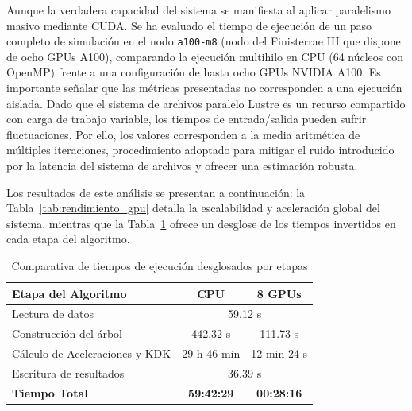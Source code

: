 Aunque la verdadera capacidad del sistema se manifiesta al aplicar paralelismo masivo mediante CUDA. Se ha evaluado el tiempo de ejecución de un paso completo de simulación en el nodo \texttt{a100-m8} (nodo del Finisterrae III que dispone de ocho GPUs A100), comparando la ejecución multihilo en CPU (64 núcleos con OpenMP) frente a una configuración de hasta ocho GPUs NVIDIA A100.
Es importante señalar que las métricas presentadas no corresponden a una ejecución aislada.
Dado que el sistema de archivos paralelo Lustre es un recurso compartido con carga de trabajo variable, los tiempos de entrada/salida pueden sufrir fluctuaciones.
Por ello, los valores corresponden a la media aritmética de múltiples iteraciones, procedimiento adoptado para mitigar el ruido introducido por la latencia del sistema de archivos y ofrecer una estimación robusta.

Los resultados de este análisis se presentan a continuación: la Tabla~\ref{tab:rendimiento_gpu} detalla la escalabilidad y aceleración global del sistema, mientras que la Tabla~\ref{tab:comparativa_cpu_gpu} ofrece un desglose de los tiempos invertidos en cada etapa del algoritmo.

\begin{table}[htbp]
    \centering
    \begin{tabularx}{\textwidth}{|X|c|c|}
        \hline
        \textbf{Etapa del Algoritmo} & \textbf{CPU} & \textbf{8 GPUs} \\ \hline

        Lectura de datos & \multicolumn{2}{c|}{59.12 s} \\ \hline

        Construcción del árbol  & 442.32 s & 111.73 s \\ \hline
        Cálculo de Aceleraciones y KDK  & 29 h 46 min & 12 min 24 s \\ \hline
        Escritura de resultados & \multicolumn{2}{c|}{36.39 s} \\ \hline
        \textbf{Tiempo Total} & \textbf{59:42:29} & \textbf{00:28:16} \\ \hline
    \end{tabularx}
    \caption{Comparativa de tiempos de ejecución desglosados por etapas}
    \label{tab:comparativa_cpu_gpu}
\end{table}

